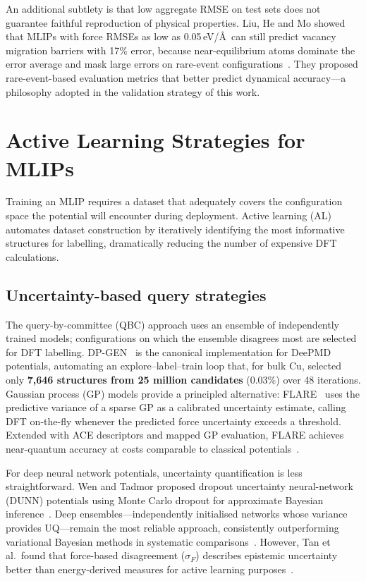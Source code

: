 \documentclass[12pt,a4paper,oneside]{book}
\begin{document}
An additional subtlety is that low aggregate RMSE on test sets does not guarantee faithful reproduction of physical properties. Liu, He and Mo showed that MLIPs with force RMSEs as low as 0.05\,eV/\AA\ can still predict vacancy migration barriers with 17\% error, because near-equilibrium atoms dominate the error average and mask large errors on rare-event configurations~\cite{Liu2023}. They proposed rare-event-based evaluation metrics that better predict dynamical accuracy---a philosophy adopted in the validation strategy of this work.

\section{Active Learning Strategies for MLIPs}
\label{sec:active_learning}

Training an MLIP requires a dataset that adequately covers the configuration space the potential will encounter during deployment. Active learning (AL) automates dataset construction by iteratively identifying the most informative structures for labelling, dramatically reducing the number of expensive DFT calculations.

\subsection{Uncertainty-based query strategies}

The query-by-committee (QBC) approach uses an ensemble of independently trained models; configurations on which the ensemble disagrees most are selected for DFT labelling. DP-GEN~\cite{Zhang2020} is the canonical implementation for DeePMD potentials, automating an explore--label--train loop that, for bulk Cu, selected only \textbf{7,646 structures from 25 million candidates} (0.03\%) over 48 iterations. Gaussian process (GP) models provide a principled alternative: FLARE~\cite{Vandermause2020} uses the predictive variance of a sparse GP as a calibrated uncertainty estimate, calling DFT on-the-fly whenever the predicted force uncertainty exceeds a threshold. Extended with ACE descriptors and mapped GP evaluation, FLARE achieves near-quantum accuracy at costs comparable to classical potentials~\cite{Vandermause2022}.

For deep neural network potentials, uncertainty quantification is less straightforward. Wen and Tadmor proposed dropout uncertainty neural-network (DUNN) potentials using Monte Carlo dropout for approximate Bayesian inference~\cite{Wen2020}. Deep ensembles---independently initialised networks whose variance provides UQ---remain the most reliable approach, consistently outperforming variational Bayesian methods in systematic comparisons~\cite{Lakshminarayanan2017}. However, Tan et al.\ found that force-based disagreement ($\sigma_F$) describes epistemic uncertainty better than energy-derived measures for active learning purposes~\cite{Tan2023}.
\end{document}
